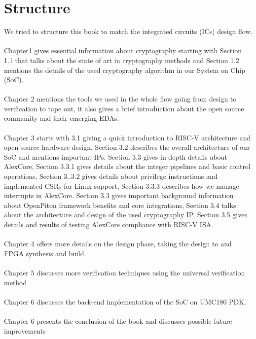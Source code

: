 \documentclass[../main.tex]{subfiles}
\begin{document}
\section{Structure}
We tried to structure this book to match the integrated circuits (ICs) design flow. 
\\
\\
Chapter1 gives essential information about cryptography starting with Section 1.1 that talks about the state of art in cryptography methods and Section 1.2 mentions the details of the used cryptography algorithm in our System on Chip (SoC). 
\\
\\
Chapter 2 mentions the tools we used in the whole flow going from design to verification to tape out, it also gives a brief introduction about the open source community and their emerging EDAs.
\\
\\
Chapter 3 starts with 3.1 giving a quick introduction to RISC-V architecture and open source hardware design. Section 3.2 describes the overall architecture of our SoC and mentions important IPs. Section 3.3  gives in-depth details about AlexCore, Section 3.3.1 gives details about the integer pipelines and basic control operations, Section 3..3.2  gives details about privilege instructions and implemented CSRs for Linux support, Section 3.3.3 describes how we manage interrupts in AlexCore. Section 3.3 gives important background information about OpenPiton framework benefits and core integrations, Section 3.4 talks about the architecture and design of the used cryptography IP, Section 3.5 gives details and results of testing AlexCore compliance with RISC-V ISA.
\\
\\
Chapter 4 offers more details on the design phase, taking the design to and FPGA synthesis and  build.
\\
\\
Chapter 5 discusses more verification techniques using the universal verification method 
\\
\\
Chapter 6 discusses the back-end implementation of the SoC on UMC180 PDK.
\\
\\
Chapter 6 presents the conclusion of the book and discusses possible future improvements
\end{document}
